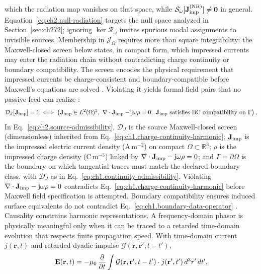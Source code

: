 which the radiation map vanishes on that space,
while \(\mathcal{S}_\omega[\mathbf{J}_{\mathrm{imp}}^{\mathrm{(NR)}}]\neq\mathbf{0}\) in general.
Equation~\eqref{eq:ch2.null-radiation} targets the null space analyzed in
Section~\ref{sec:ch272}; ignoring \(\ker\mathcal{R}_\omega\) invites spurious modal
assignments to invisible sources.
Membership in \(\mathcal{J}_\Omega\) requires more than square integrability:
the Maxwell-closed screen below states, in compact form, which impressed currents
may enter the radiation chain without contradicting charge continuity or boundary
compatibility. The screen encodes the physical requirement that impressed currents be charge-consistent
and boundary-compatible before Maxwell's equations are solved
\cite{maxwell1873}. Violating it yields formal field pairs that no passive feed can
realize \cite{harrington2001}:
\begin{equation}
\label{eq:ch2.source-admissibility}
\mathcal{D}_{J}[\mathbf{J}_{\mathrm{imp}}]=1
\iff
\left(
\mathbf{J}_{\mathrm{imp}}\in L^{2}(\Omega)^{3},\
\nabla\cdot\mathbf{J}_{\mathrm{imp}}-\mathrm{j}\omega\rho=0,\
\mathbf{J}_{\mathrm{imp}}\ \text{satisfies BC compatibility on }\Gamma
\right),
\end{equation}
In Eq.~\eqref{eq:ch2.source-admissibility},
\(\mathcal{D}_{J}\) is the source Maxwell-closed screen (dimensionless) inherited from
Eq.~\eqref{eq:ch1.charge-continuity-harmonic};
\(\mathbf{J}_{\mathrm{imp}}\) is the impressed electric current density (A\,m\(^{-2}\)) on compact
\(\Omega\subset\mathbb{R}^{3}\);
\(\rho\) is the impressed charge density (C\,m\(^{-3}\)) linked by
\(\nabla\cdot\mathbf{J}_{\mathrm{imp}}-\mathrm{j}\omega\rho=0\); and \(\Gamma=\partial\Omega\) is the boundary on which
tangential traces must match the declared boundary class.
with \(\mathcal{D}_{J}\) as in Eq.~\eqref{eq:ch1.continuity-admissibility}.
Violating \(\nabla\cdot\mathbf{J}_{\mathrm{imp}}-\mathrm{j}\omega\rho=0\) contradicts
Eq.~\eqref{eq:ch1.charge-continuity-harmonic} before Maxwell field specification is attempted.
Boundary compatibility ensures induced surface equivalents do not contradict
Eq.~\eqref{eq:ch1.boundary-data-operator} \cite{stratton1941}.
Causality constrains harmonic representations.
A frequency-domain phasor is physically meaningful only when it can be traced to a
retarded time-domain evolution that respects finite propagation speed.
With time-domain
current \(j(\mathbf{r},t)\) and retarded dyadic impulse
\(\mathcal{G}(\mathbf{r},\mathbf{r}',t-t')\),
\begin{equation}
\label{eq:ch2.causality-retarded}
\mathbf{E}(\mathbf{r},t)
=
-\mu_0\,\frac{\partial}{\partial t}
\int
\mathcal{G}(\mathbf{r},\mathbf{r}',t-t')\cdot j(\mathbf{r}',t')\,d^{3}r'\,dt',
\end{equation}
